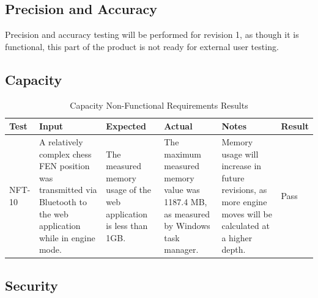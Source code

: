 \documentclass[12pt, titlepage]{article}
\begin{document}
\subsection{Precision and Accuracy}

Precision and accuracy testing will be performed for revision 1, as though it is functional, this part of the product is not ready for external user testing.

\subsection{Capacity}

\begin{table}[H]
\centering
    \setlength{\leftmargini}{0.4cm}
    \begin{tabular}{| >{\centering\arraybackslash}m{1cm} | 
        >{\centering\arraybackslash}m{2.5cm} | 
        >{\centering\arraybackslash}m{4cm} | 
        >{\centering\arraybackslash}m{3cm} |
        >{\centering\arraybackslash}m{3cm} |
        >{\centering\arraybackslash}m{1.5cm} |}
    \hline
    \rowcolor[gray]{0.9}
    Test & Input & Expected & Actual & Notes & Result\\
    \hline
    NFT-10 & A relatively complex chess FEN position was transmitted via Bluetooth to the web application while in engine mode. & The measured memory usage of the web application is less than 1GB. & The maximum measured memory value was 1187.4 MB, as measured by Windows task manager. & Memory usage will increase in future revisions, as more engine moves will be calculated at a higher depth. & Pass \\
    \hline
    \end{tabular}
\caption{Capacity Non-Functional Requirements Results}
\end{table}

\subsection{Security}
\end{document}
